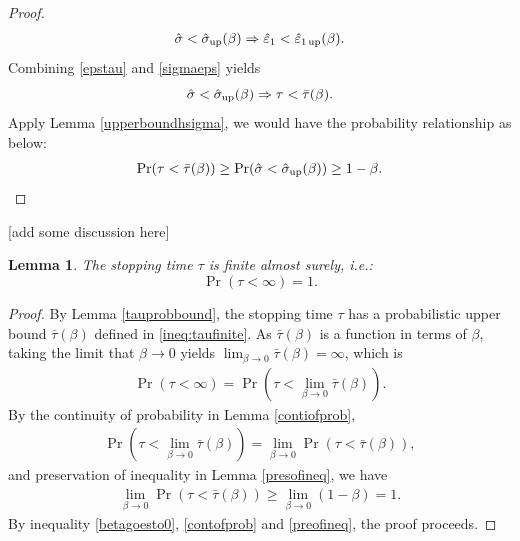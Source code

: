 \documentclass{iitthesis}
\newtheorem{lemma}[theorem]{Lemma}
\theoremstyle{definition}
\begin{document}
\begin{proof}
\begin{align}\label{sigmaeps}
 \hat{\sigma} < \hat{\sigma}_{\operatorname{up}}(\beta) \Rightarrow \hat{\varepsilon}_1 < \hat{\varepsilon}_{1\operatorname{up}}(\beta).
\end{align}
Combining \eqref{epstau} and \eqref{sigmaeps} yields
$$\hat{\sigma} < \hat{\sigma}_{\operatorname{up}}(\beta) \Rightarrow\tau <\bar{\tau}(\beta).$$
Apply Lemma \ref{upperboundhsigma}, we would have the probability relationship as below: 
\begin{align*}
\Pr(\tau < \bar{\tau}(\beta)) \geq  \Pr(\hat{\sigma} < \hat{\sigma}_{\operatorname{up}}(\beta)) \geq 1-\beta.
\end{align*}
\end{proof}
[add some discussion here]
\begin{lemma}\label{taufinite}
The stopping time $\tau$ is finite almost surely, i.e.:
$$\Pr(\tau < \infty) = 1.$$
\end{lemma}
\begin{proof}
By Lemma \ref{tauprobbound}, the stopping time $\tau$ has a probabilistic upper bound $\bar{\tau}(\beta)$ defined in \eqref{ineq:taufinite}. As $\bar{\tau}(\beta)$ is a function in terms of $\beta$, taking the limit that $\beta \to 0$ yields $\lim_{\beta \to 0} \bar{\tau}(\beta) = \infty$, which is
\begin{align}\label{betagoesto0}
\Pr(\tau < \infty) = \Pr(\tau  <\lim_{\beta \to 0}\bar{\tau}(\beta)).
\end{align}
By the continuity of probability in Lemma \ref{contiofprob}, 
\begin{align}\label{contofprob}
 \Pr(\tau  <\lim_{\beta \to 0}\bar{\tau}(\beta)) =\lim_{\beta \to 0} \Pr(\tau  <\bar{\tau}(\beta)),
\end{align}
and preservation of inequality in Lemma \ref{presofineq}, we have
\begin{align}\label{preofineq}
\lim_{\beta \to 0} \Pr(\tau  <\bar{\tau}(\beta)) 
\geq \lim_{\beta \to 0}(1-\beta) = 1.
\end{align}
By inequality \eqref{betagoesto0}, \eqref{contofprob} and \eqref{preofineq}, the proof proceeds.
\end{proof}
\end{document}
